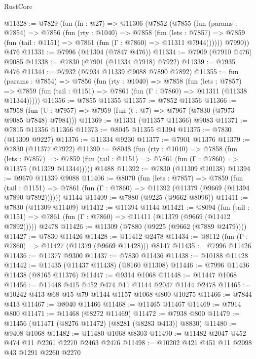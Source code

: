 \begin{lexlean}{RustCore}
\begin{coremodule}
@11328 := @7829
    (fun (fn : @27) =>
    @11306
      (@7852
        (@7855
          (fun (params : @7854) =>
          @7856
            (fun (rty : @1040) =>
            @7858
              (fun (lets : @7857) =>
              @7859 (fun (tail : @1151) => @7861 (fun (Γ : @7860) => @11311 @7944))))))
        @7990))
    @476
@11331 := @7996 (@11304 (@7847 @476))
@11334 := @7909 (@7910 @476) @9085
@11338 := @7830 (@7901 (@11334 @7918) @7922)
@11339 := @7935 @476
@11344 := @7932 (@7934 @11339 @9088 @7890 @7892)
@11355 := fun (params : @7854) =>
  @7856
    (fun (rty : @1040) =>
    @7858
      (fun (lets : @7857) =>
      @7859 (fun (tail : @1151) => @7861 (fun (Γ : @7860) => @11311 (@11338 @11344)))))
@11356 := @7855 @11355
@11357 := @7852 @11356
@11366 := @7958 (fun (U : @7957) => @7959 (fun (t : @7) => @7967 (@7830 (@7973 @9085 @7848) @7984)))
@11369 := @11331 (@11357 @11366) @9083
@11371 := @7815 @11356 @11366
@11373 := @8045 @11355 @1394
@11375 := @7830 (@11309 @9227)
@11376 := @11334 @9230
@11377 := @7901 @11376
@11379 := @7830 (@11377 @7922)
@11390 := @8048
    (fun (rty : @1040) =>
    @7858
      (fun (lets : @7857) =>
      @7859 (fun (tail : @1151) => @7861 (fun (Γ : @7860) => @11375 (@11379 @11344)))))
    @1488
@11392 := @7830 (@11309 @10138)
@11394 := @9670 @11339 @9088
@11406 := @8070
    (fun (lets : @7857) =>
    @7859
      (fun (tail : @1151) =>
      @7861 (fun (Γ : @7860) => @11392 (@11379 (@9669 (@11394 @7890 @7892))))))
    @1144
@11409 := @7880 (@9225 (@9662 @8096))
@11411 := @7830 (@11309 @11409)
@11412 := @11394 @1144
@11421 := @8094
    (fun (tail : @1151) => @7861 (fun (Γ : @7860) => @11411 (@11379 (@9669 (@11412 @7892)))))
    @2478
@11426 := @11309 (@7880 (@9225 (@9662 (@7889 @2479))))
@11427 := @7830 @11426
@11428 := @11412 @2478
@11434 := @8112 (fun (Γ : @7860) => @11427 (@11379 (@9669 @11428))) @8147
@11435 := @7996 @11426
@11436 := @11377 @9300
@11437 := @7830 @11436
@11438 := @10188 @11428
@11442 := @11435 (@11437 @11438) (@8160 @11308)
@11446 := @7996 @11436 @11438 (@8165 @11376)
@11447 := @9314 @1068
@11448 := @11447 @1068
@11456 := @11448 @415 @452 @474 @11 @1144 @2047 @1144 @2478
@11465 := @10242 @413 @68 @15 @79 @1144 @1157 @1068 @800 @10275
@11466 := @7844 @413
@11467 := @8040 @11466
@11468 := @11465 @11467
@11469 := @7914 @800
@11471 := @11468 (@8272 @11469)
@11472 := @7938 @800
@11479 := @11456 (@11471 (@8276 @11472) (@8281 (@8283 @413)) @8830)
@11480 := @9408 @1068
@11482 := @11480 @1068 @8303
@11490 := @11482 @2047 @452 @474 @11 @2261 @2270 @2463 @2476
@11498 := @10202 @421 @451 @11 @2098 @43 @1291 @2260 @2270

\end{coremodule}
\end{lexlean}
